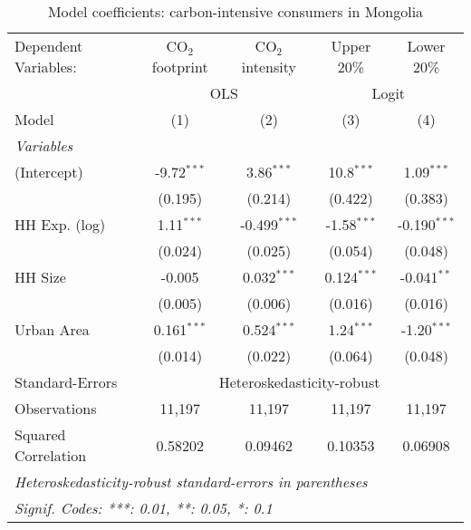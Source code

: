
\begin{table}[htbp!]
   \centering
   \small
   \begin{adjustbox}{width = 1\textwidth, max height = 0.95\textheight, center}
      \begin{threeparttable}[b]
         \caption{\label{tab:Logit_1_MNG} Model coefficients: carbon-intensive consumers in Mongolia}
         \begin{tabular}{lcccc}
            \tabularnewline \midrule \midrule
            Dependent Variables: & CO$_{2}$ footprint & CO$_{2}$ intensity & Upper 20\%    & Lower 20\%\\   
             & \multicolumn{2}{c}{OLS} & \multicolumn{2}{c}{Logit} \\ 
            Model                & (1)                & (2)                & (3)           & (4)\\  
            \midrule
            \emph{Variables}\\
            (Intercept)          & -9.72$^{***}$      & 3.86$^{***}$       & 10.8$^{***}$  & 1.09$^{***}$\\   
                                 & (0.195)            & (0.214)            & (0.422)       & (0.383)\\   
            HH Exp. (log)        & 1.11$^{***}$       & -0.499$^{***}$     & -1.58$^{***}$ & -0.190$^{***}$\\   
                                 & (0.024)            & (0.025)            & (0.054)       & (0.048)\\   
            HH Size              & -0.005             & 0.032$^{***}$      & 0.124$^{***}$ & -0.041$^{**}$\\   
                                 & (0.005)            & (0.006)            & (0.016)       & (0.016)\\   
            Urban Area           & 0.161$^{***}$      & 0.524$^{***}$      & 1.24$^{***}$  & -1.20$^{***}$\\   
                                 & (0.014)            & (0.022)            & (0.064)       & (0.048)\\   
            \midrule 
            Standard-Errors & \multicolumn{4}{c}{Heteroskedasticity-robust} \\ 
            Observations         & 11,197             & 11,197             & 11,197        & 11,197\\  
            Squared Correlation  & 0.58202            & 0.09462            & 0.10353       & 0.06908\\  
            \midrule \midrule
            \multicolumn{5}{l}{\emph{Heteroskedasticity-robust standard-errors in parentheses}}\\
            \multicolumn{5}{l}{\emph{Signif. Codes: ***: 0.01, **: 0.05, *: 0.1}}\\
         \end{tabular}
         

\end{threeparttable}
\end{adjustbox}
\end{table}
